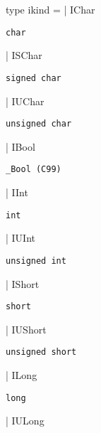 \documentclass[11pt]{article}
\begin{document}
\label{type:Cil.ikind}\begin{ocamldoccode}
type ikind =
  | IChar
\end{ocamldoccode}
\begin{ocamldoccomment}
{\tt{char}}
\end{ocamldoccomment}
\begin{ocamldoccode}
  | ISChar
\end{ocamldoccode}
\begin{ocamldoccomment}
{\tt{signed char}}
\end{ocamldoccomment}
\begin{ocamldoccode}
  | IUChar
\end{ocamldoccode}
\begin{ocamldoccomment}
{\tt{unsigned char}}
\end{ocamldoccomment}
\begin{ocamldoccode}
  | IBool
\end{ocamldoccode}
\begin{ocamldoccomment}
{\tt{\_Bool (C99)}}
\end{ocamldoccomment}
\begin{ocamldoccode}
  | IInt
\end{ocamldoccode}
\begin{ocamldoccomment}
{\tt{int}}
\end{ocamldoccomment}
\begin{ocamldoccode}
  | IUInt
\end{ocamldoccode}
\begin{ocamldoccomment}
{\tt{unsigned int}}
\end{ocamldoccomment}
\begin{ocamldoccode}
  | IShort
\end{ocamldoccode}
\begin{ocamldoccomment}
{\tt{short}}
\end{ocamldoccomment}
\begin{ocamldoccode}
  | IUShort
\end{ocamldoccode}
\begin{ocamldoccomment}
{\tt{unsigned short}}
\end{ocamldoccomment}
\begin{ocamldoccode}
  | ILong
\end{ocamldoccode}
\begin{ocamldoccomment}
{\tt{long}}
\end{ocamldoccomment}
\begin{ocamldoccode}
  | IULong
\end{ocamldoccode}
\end{document}
